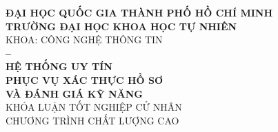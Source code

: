 
\begin{titlepage}
  
  \begin{center}

    {\large \textbf{ĐẠI HỌC QUỐC GIA THÀNH PHỐ HỒ CHÍ MINH}} \\
    \smallskip
    {\large \textbf{TRƯỜNG ĐẠI HỌC KHOA HỌC TỰ NHIÊN}} \\
    \medskip
    KHOA: CÔNG NGHỆ THÔNG TIN \\[2.7cm]

    {\Large \bfseries \studentonename{} -- \studenttwoname} \\[3.5cm]

    {\huge \bfseries HỆ THỐNG UY TÍN \\ PHỤC VỤ XÁC THỰC HỒ SƠ \\[3mm] VÀ ĐÁNH GIÁ KỸ NĂNG} \\[3.5cm]

    {\large KHÓA LUẬN TỐT NGHIỆP CỬ NHÂN} \\
    {\large CHƯƠNG TRÌNH CHẤT LƯỢNG CAO} \\[2cm]

    \vfill
  \end{center}
\end{titlepage}

\restoregeometry